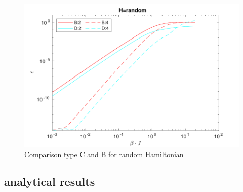 \begin{figure}[H]
    \center
    \includegraphics[width=\textwidth]{Figuren/benchmarking/type5/ranodm.pdf}
    \caption{Comparison type C and B for random Hamiltonian}
\end{figure}

\subsection{analytical results}